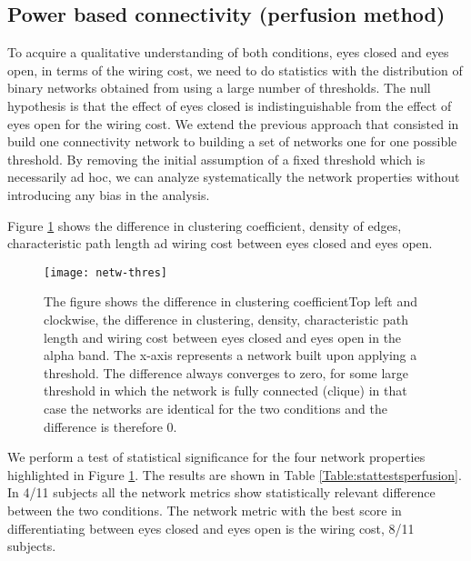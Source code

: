 \documentclass[11pt, onecolumn]{article}
\begin{document}
\subsection{Power based connectivity (perfusion method)}
\label{ss:perfusion}
To acquire a qualitative understanding of both conditions, eyes closed and eyes open, in terms of the wiring cost, we need to do statistics with the distribution of binary networks obtained from using a large number of thresholds.
The null hypothesis is that the effect of eyes closed is indistinguishable from the effect of eyes open for the wiring cost. We extend the previous approach that consisted in build one connectivity network to building a set of networks one for one possible threshold. By removing the initial assumption of a fixed threshold which is necessarily ad hoc, we can analyze systematically the network properties without introducing any bias in the analysis.

Figure \ref{fig:netw-thres} shows the difference in clustering coefficient, density of edges, characteristic path length ad wiring cost between eyes closed and eyes open.

\begin{figure}[H]
        \centering
        \texttt{[image: netw-thres]}
        \caption{The figure shows the difference in clustering coefficientTop left and clockwise, the difference in clustering, density, characteristic path length and wiring cost between eyes closed and eyes open in the alpha band. The x-axis represents a network built upon applying a threshold. The difference always converges to zero, for some large threshold in which the network is fully connected (clique) in that case the networks are identical for the two conditions and the difference is therefore 0. }
\label{fig:netw-thres}
\end{figure}

We perform a test of statistical significance for the four network properties highlighted in Figure \ref{fig:netw-thres}. The results are shown in Table \ref{Table:stattestsperfusion}. In 4/11 subjects all the network metrics show statistically relevant difference between the two conditions. The network metric with the best score in differentiating between eyes closed and eyes open is the wiring cost, 8/11 subjects.
\end{document}
